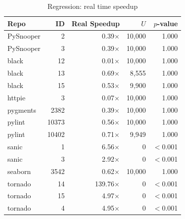 \begin{table}[htbp]
    \centering
    \caption{Regression: real time speedup}
    \label{tab:regression_real}
    \small
    \renewcommand{\arraystretch}{1.2}
    \begin{tabularx}{\linewidth}{@{} >{\raggedright\arraybackslash}X r r r r @{}}
        \toprule
        \textbf{Repo} & \textbf{ID} & \textbf{Real Speedup} & \textbf{$U$} & \textbf{$p$-value} \\
        \midrule
        PySnooper     & 2           & 0.39$\times$          & 10,000       & 1.000              \\
        PySnooper     & 3           & 0.39$\times$          & 10,000       & 1.000              \\
        black         & 12          & 0.01$\times$          & 10,000       & 1.000              \\
        black         & 13          & 0.69$\times$          & 8,555        & 1.000              \\
        black         & 15          & 0.53$\times$          & 9,900        & 1.000              \\
        httpie        & 3           & 0.07$\times$          & 10,000       & 1.000              \\
        pygments      & 2382        & 0.39$\times$          & 10,000       & 1.000              \\
        pylint        & 10373       & 0.56$\times$          & 10,000       & 1.000              \\
        pylint        & 10402       & 0.71$\times$          & 9,949        & 1.000              \\
        sanic         & 1           & 6.56$\times$          & 0            & $<$0.001           \\
        sanic         & 3           & 2.92$\times$          & 0            & $<$0.001           \\
        seaborn       & 3542        & 0.62$\times$          & 10,000       & 1.000              \\
        tornado       & 14          & 139.76$\times$        & 0            & $<$0.001           \\
        tornado       & 15          & 4.97$\times$          & 0            & $<$0.001           \\
        tornado       & 4           & 4.95$\times$          & 0            & $<$0.001           \\
        \bottomrule
    \end{tabularx}
\end{table}

